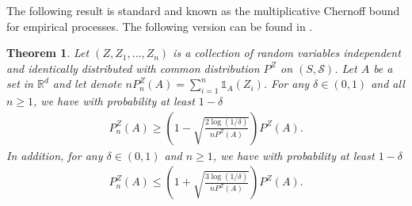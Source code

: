\documentclass[paper=a4, fontsize=11pt]{scrartcl}
\newcommand{\ind}{\mathds{1}}
\newcommand{\PP}{\mathbb{P}}
\newtheorem{theorem}{Theorem}
\begin{document}

The following result is standard and known as the multiplicative Chernoff bound for empirical processes. The following version can be found in \cite{hagerup1990guided}.


\begin{theorem}\label{lemma=chernoff}
Let $(Z, Z_1, \ldots , Z_n) $ is a collection of random variables independent and identically distributed with common distribution $P^Z$ on $(S,\mathcal S)$. Let $A$ be a set in $\mathbb R^d$ and let denote $nP_n^Z(A) = \sum_{i=1}^n \ind_{A}(Z_i)$. For any $\delta \in (0,1)$ and all $n\geq 1$, we have with probability at least $1-\delta$
\begin{align*}
P_n^Z(A) \geq \left(1- \sqrt{ \frac{2 \log(1/\delta)  }{ nP^Z(A) } } \right) P^Z(A)  .
\end{align*}
 In addition, for any $\delta \in (0,1)$ and $n\geq 1$, we have with probability at least $1-\delta$
\begin{align*}
P_n^Z(A)  \leq \left(1 +  \sqrt{ \frac{3 \log(1/\delta)   }{ n P^Z(A)} }  \right) P^Z(A).
\end{align*}
\end{theorem}
\end{document}
